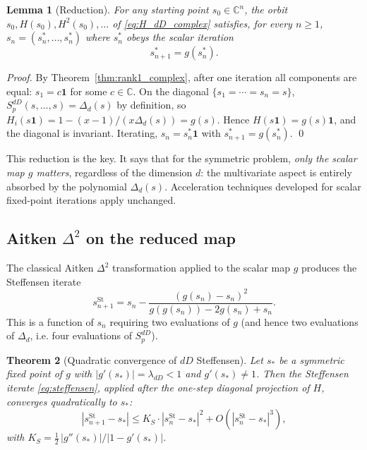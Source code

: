 \documentclass[11pt,a4paper]{article}
\newtheorem{theorem}{Theorem}
\newtheorem{lemma}[theorem]{Lemma}
\theoremstyle{definition}
\theoremstyle{remark}
\newcommand{\C}{\mathbb{C}}
\newcommand{\one}{\mathbf{1}}
\begin{document}
\begin{lemma}[Reduction]
\label{lem:reduction}
For any starting point $s_0 \in \C^n$, the orbit
$s_0, H(s_0), H^2(s_0), \ldots$ of \eqref{eq:H_dD_complex}
satisfies, for every $n \geq 1$, $s_n = (s_n^*, \ldots, s_n^*)$ where
$s_n^*$ obeys the scalar iteration
\[
  s_{n+1}^* = g(s_n^*).
\]
\end{lemma}

\begin{proof}
By Theorem~\ref{thm:rank1_complex}, after one iteration all components
are equal: $s_1 = c \one$ for some $c \in \C$.  On the diagonal
$\{s_1 = \cdots = s_n = s\}$, $S_p^{dD}(s, \ldots, s) = \Delta_d(s)$ by
definition, so $H_i(s\one) = 1 - (x-1)/(x \Delta_d(s)) = g(s)$.  Hence
$H(s\one) = g(s) \one$, and the diagonal is invariant.  Iterating, $s_n
= s_n^* \one$ with $s_{n+1}^* = g(s_n^*)$. \qed
\end{proof}

This reduction is the key.  It says that for the symmetric problem,
\emph{only the scalar map $g$ matters}, regardless of the dimension $d$:
the multivariate aspect is entirely absorbed by the polynomial
$\Delta_d(s)$.  Acceleration techniques developed for scalar
fixed-point iterations apply unchanged.

\subsection{Aitken $\Delta^2$ on the reduced map}

The classical Aitken $\Delta^2$ transformation
\cite[Section~12]{0pandrosion_pth} applied to the scalar map $g$ produces
the Steffensen iterate
\begin{equation}
  \label{eq:steffensen}
  s^{\mathrm{St}}_{n+1} = s_n - \frac{(g(s_n) - s_n)^2}{g(g(s_n)) - 2 g(s_n) + s_n}.
\end{equation}
This is a function of $s_n$ requiring two evaluations of $g$ (and hence
two evaluations of $\Delta_d$, i.e. four evaluations of $S_p^{dD}$).

\begin{theorem}[Quadratic convergence of $dD$ Steffensen]
\label{thm:steffensen_dD}
Let $s_*$ be a symmetric fixed point of $g$ with $|g'(s_*)| =
\lambda_{dD} < 1$ and $g'(s_*) \neq 1$.  Then the Steffensen iterate
\eqref{eq:steffensen}, applied after the one-step diagonal projection of
$H$, converges quadratically to $s_*$:
\[
  |s_{n+1}^{\mathrm{St}} - s_*| \leq K_S \cdot |s_n^{\mathrm{St}} - s_*|^2 + O(|s_n^{\mathrm{St}} - s_*|^3),
\]
with $K_S = \frac{1}{2}\, |g''(s_*)| / |1 - g'(s_*)|$.
\end{theorem}
\end{document}
